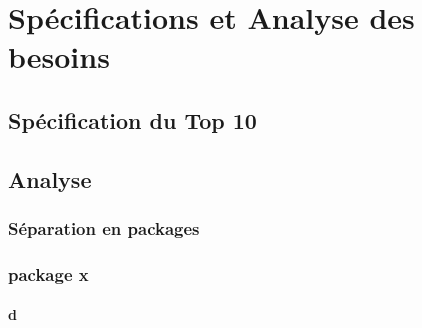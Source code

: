 \chapter{Spécifications et Analyse des besoins}

\section{Spécification du Top 10}

\section{Analyse}

\subsection{Séparation en packages}

\subsection{package x}

\subsubsection*{d}


\clearpage 